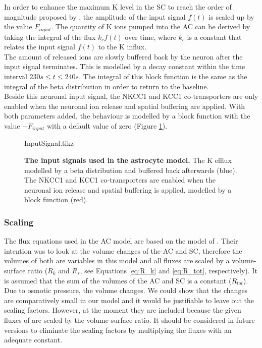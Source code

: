 In order to enhance the maximum \gls{K} level in the SC to reach the order of magnitude proposed by \citet{Filosa2004}, the amplitude of the input signal $f(t)$ is scaled up by the value $F_{input}$. The quantity of \gls{K} ions pumped into the AC can be derived by taking the integral of the flux $k_c f(t)$ over time, where $k_c$ is a constant that relates the input signal $f(t)$ to the \gls{K} influx. \\

The amount of released  ions are slowly buffered back by the neuron after the input signal terminates. This is modelled by a decay constant within the time interval $ 230 s \leq t \leq 240 s$. The integral of this block function is the same as the integral of the beta distribution in order to return to the baseline.\\

Beside this neuronal input signal, the NKCC1 and KCC1 co-transporters are only enabled when the neuronal ion release and spatial buffering are applied.  With both parameters added, the behaviour is modelled by a block function with the value $-F_{input}$ with a default value of zero (Figure \ref{fig:InputSignal}). \\
%
%
\begin{figure}[h!]
	\centering
	\footnotesize %
	\setlength\figureheight{6cm} 
	\setlength\figurewidth{10 cm}
	{InputSignal.tikz}
	\caption{\textbf{The input signals used in the astrocyte model.} The \gls{K} efflux modelled by a beta distribution and buffered back afterwards (blue). The NKCC1 and KCC1 co-transporters are enabled when the neuronal ion release and spatial buffering is applied, modelled by a block function (red).  }
	\label{fig:InputSignal}
\end{figure}
% 
%
\subsubsection{Scaling}
The flux equations used in the AC model are based on the model of \citet{Ostby2009}. Their intention was to look at the volume changes of the AC and SC, therefore the volumes of both are variables in this model and all fluxes are scaled by a volume-surface ratio ($R_k$ and $R_s$, see Equations \ref{eq:R_k} and \ref{eq:R_tot}, respectively). It is assumed that the sum of the volumes of the AC and SC is a constant ($R_{tot}$). Due to osmotic pressure, the volume changes. We could show that the changes are comparatively small in our model and it would be justifiable to leave out the scaling factors. However, at the moment they are included because the given fluxes of \citet{Ostby2009} are scaled by the volume-surface ratio. It should be considered in future versions to eliminate the scaling factors by multiplying the fluxes with an adequate constant. 




